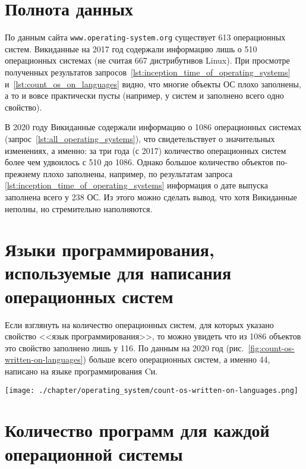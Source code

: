 \section{Полнота данных}
По данным сайта \verb|www.operating-system.org| существует 613 операционных систем\autocite{list_operating_systems}. 
Викиданные на 2017 год содержали информацию лишь о 510 операционных системах 
(не считая \num{667} дистрибутивов Linux\autocite{list_operating_systems}). 
При просмотре полученных результатов 
запросов~\ref{lst:inception_time_of_operating_systems} и~\ref{lst:count_os_on_languages} видно, 
что многие объекты ОС плохо заполнены, а то и вовсе практически пусты 
(например, у систем  и  заполнено всего одно свойство\autocite{prowd_os_link}).

В 2020 году Викиданные содержали информацию о 1086 операционных системах 
(запрос~\ref{lst:all_operating_systems}), что свидетельствует о значительных изменениях, 
а именно: за три года (с 2017) количество операционных систем более чем удвоилось с 510 до 1086. 
Однако большое количество объектов по-прежнему плохо заполнены, 
например, по результатам запроса \ref{lst:inception_time_of_operating_systems} 
информация о дате выпуска заполнена всего у \num{238} ОС. 
Из этого можно сделать вывод, что хотя Викиданные неполны, но стремительно наполняются.


\section{Языки программирования, используемые для написания операционных систем}

Если взглянуть на количество операционных систем, для которых указано свойство <<язык программирования>>, то можно увидеть что из \num{1086} объектов это свойство заполнено лишь у \num{116}. По данным на 2020 год (рис.~\ref{fig:count-os-written-on-languages}) больше всего операционных систем, а именно 44, написано на языке программирования Cи.

\begin{figure*}[h!]
	\texttt{[image: ./chapter/operating\_system/count-os-written-on-languages.png]}
	\caption{Первые восемь языков, на которых написано больше всего операционных систем, 2020 год.}
	\label{fig:count-os-written-on-languages}
\end{figure*}


\section{Количество программ для каждой операционной системы}

